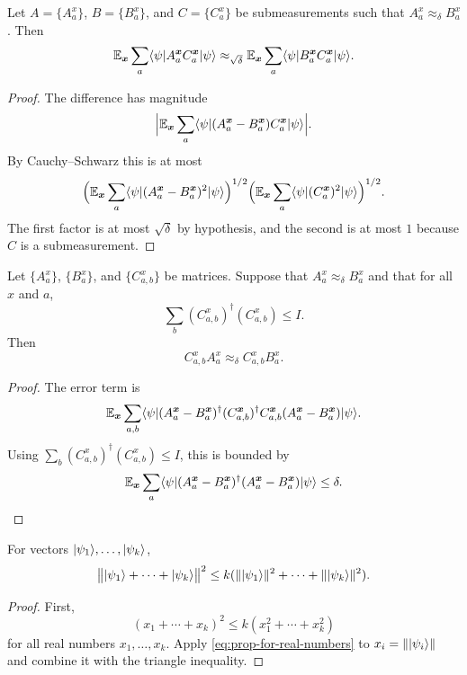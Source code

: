 \begin{theorem}\label{prop:easy-approx-from-approx-delta}
	\leanok
	Let $A = \{A^x_a\}$, $B = \{B^x_a\}$, and $C = \{C^x_a\}$ be submeasurements such that $A^x_a \approx_{\delta} B^x_a$. Then
	\begin{equation*}
		\mathbb{E}_{{\boldsymbol{x}}} \sum_a \langle \psi \rvert A^{{\boldsymbol{x}}}_a  C^{{\boldsymbol{x}}}_a \lvert \psi \rangle
		\approx_{\sqrt{\delta}} \mathbb{E}_{{\boldsymbol{x}}} \sum_a \langle \psi \rvert B^{{\boldsymbol{x}}}_a  C^{{\boldsymbol{x}}}_a \lvert \psi \rangle.
	\end{equation*}
\end{theorem}
\begin{proof}
	\leanok
	The difference has magnitude
	\[
		\Big| \mathbb{E}_{{\boldsymbol{x}}} \sum_a \langle \psi \rvert (A^{{\boldsymbol{x}}}_a - B^{{\boldsymbol{x}}}_a) C^{{\boldsymbol{x}}}_a \lvert \psi \rangle\Big|.
	\]
	By Cauchy--Schwarz this is at most
	\[
		\Big(\mathbb{E}_{{\boldsymbol{x}}} \sum_a \langle \psi \rvert (A^{{\boldsymbol{x}}}_a - B^{{\boldsymbol{x}}}_a)^2 \lvert \psi \rangle\Big)^{1/2}
		\Big(\mathbb{E}_{{\boldsymbol{x}}} \sum_a \langle \psi \rvert (C^{{\boldsymbol{x}}}_a)^2 \lvert \psi \rangle\Big)^{1/2}.
	\]
	The first factor is at most $\sqrt{\delta}$ by hypothesis, and the second is at most $1$ because $C$ is a submeasurement.
\end{proof}

\begin{theorem}\label{prop:cab-approx-delta}
	\leanok
	Let $\{A^x_a\}$, $\{B^x_a\}$, and $\{C^x_{a,b}\}$ be matrices. Suppose that $A^{x}_a \approx_\delta B^{x}_a$ and that for all $x$ and $a$,
	\[
		\sum_b (C^{x}_{a,b})^\dagger (C^{x}_{a,b}) \leq I.
	\]
	Then
	\[
		C^{x}_{a,b} A^x_{a} \approx_{\delta} C^{x}_{a,b} B^{x}_a.
	\]
\end{theorem}
\begin{proof}
	\leanok
	The error term is
	\[
		\mathbb{E}_{{\boldsymbol{x}}} \sum_{a,b} \langle \psi \rvert
		(A^{{\boldsymbol{x}}}_a - B^{{\boldsymbol{x}}}_a)^\dagger
		(C^{{\boldsymbol{x}}}_{a,b})^\dagger C^{{\boldsymbol{x}}}_{a,b}
		(A^{{\boldsymbol{x}}}_a - B^{{\boldsymbol{x}}}_a) \lvert \psi \rangle.
	\]
	Using $\sum_b (C^{x}_{a,b})^\dagger (C^{x}_{a,b}) \le I$, this is bounded by
	\[
		\mathbb{E}_{{\boldsymbol{x}}} \sum_a \langle \psi \rvert
		(A^{{\boldsymbol{x}}}_a - B^{{\boldsymbol{x}}}_a)^\dagger
		(A^{{\boldsymbol{x}}}_a - B^{{\boldsymbol{x}}}_a) \lvert \psi \rangle
		\le \delta.
	\]
\end{proof}

\begin{lemma}\label{prop:triangle-inequality-for-vectors-squared}
	\leanok
	For vectors $\lvert \psi_1 \rangle,\dots,\lvert \psi_k \rangle$,
	\[
		\bigl\lVert \lvert \psi_1 \rangle+\cdots+\lvert \psi_k \rangle \bigr\rVert^2 \le k(\lVert\lvert \psi_1 \rangle\rVert^2+\cdots+\lVert\lvert \psi_k \rangle\rVert^2).
	\]
\end{lemma}
\begin{proof}
	\leanok
	First,
	\begin{equation}\label{eq:prop-for-real-numbers}
		(x_1+\cdots+x_k)^2 \le k(x_1^2+\cdots+x_k^2)
	\end{equation}
	for all real numbers $x_1,\dots,x_k$. Apply \eqref{eq:prop-for-real-numbers} to $x_i=\lVert\lvert \psi_i \rangle\rVert$ and combine it with the triangle inequality.
\end{proof}

